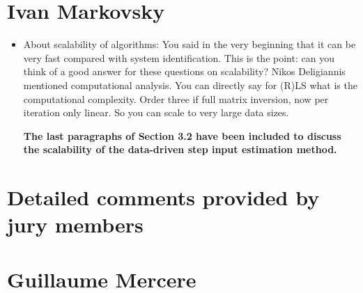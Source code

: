 \documentclass[11pt]{article}
\begin{document}
\section*{Ivan Markovsky}

\begin{itemize}
	\item About scalability of algorithms: You said in the very beginning that it can be very fast compared with system identification. This is the point: can you think of a good answer for these questions on scalability? Nikos Deligiannis mentioned computational analysis. You can directly say for (R)LS what is the computational complexity. Order three if full matrix inversion, now per iteration only linear. So you can scale to very large data sizes.
	
	{\bfseries The last paragraphs of Section 3.2 have been included to discuss the scalability of the data-driven step input estimation method.  }

\end{itemize}

\section*{Detailed comments provided by jury members}

\section*{Guillaume Mercere}
\end{document}
